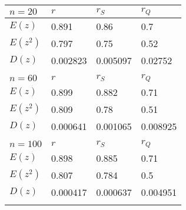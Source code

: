 \begin{tabular}{|l|l|l|l|}\hline $n=20$&$r$&$r_S$&$r_Q$  \\\hline$E(z)$&0.891&0.86&0.7\\\hline$E(z^2)$&0.797&0.75&0.52\\\hline$D(z)$&0.002823&0.005097&0.02752\\\hline &  &  &  \\\hline $n=60$&$r$&$r_S$&$r_Q$  \\\hline$E(z)$&0.899&0.882&0.71\\\hline$E(z^2)$&0.809&0.78&0.51\\\hline$D(z)$&0.000641&0.001065&0.008925\\\hline &  &  &  \\\hline $n=100$&$r$&$r_S$&$r_Q$  \\\hline$E(z)$&0.898&0.885&0.71\\\hline$E(z^2)$&0.807&0.784&0.5\\\hline$D(z)$&0.000417&0.000637&0.004951\\\hline &  &  &  \\\hline \end{tabular}
